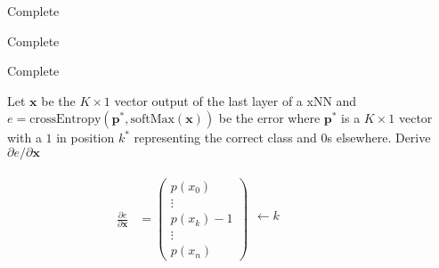 \documentclass[11pt]{article}
\newcommand{\pd}{\partial}
\newcommand{\bs}{\boldsymbol}
\begin{document}
\noindent
\begin{solution}
	Complete
\end{solution}

\begin{solution}
	Complete
\end{solution}

\begin{solution}
	Complete
\end{solution}

Let $\boldsymbol{x}$ be the $K \times 1$ vector output of the last layer of a
xNN and
$e = \text{crossEntropy}(\boldsymbol{p}^*,\text{softMax}(\boldsymbol{x}))$
be the error where $\boldsymbol{p}^*$ is a $K \times 1$ vector with a $1$ in
position $k^*$ representing the correct class and $0$s elsewhere. Derive
$\pd e/ \pd\boldsymbol{x}$

\begin{solution}
	\begin{align}
		\frac{\pd e}{\pd \bs{x}} &=
		\begin{pmatrix}
			p(x_{0}) \\
			\vdots \\
			p(x_{k})-1 \\
			\vdots \\
			p(x_{n})
		\end{pmatrix}
		\begin{matrix}
			\phantom{p(x_{0})} \\
			\phantom{\vdots} \\
			\leftarrow k \phantom{p(x_{k})-1} \\
			\phantom{\vdots} \\
			\phantom{p(x_{n})} \\
		\end{matrix}
	\end{align}
\end{solution}
\end{document}
